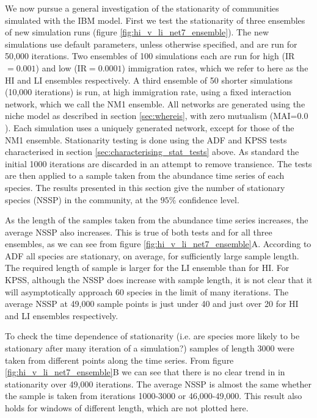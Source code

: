We now pursue a general investigation of the stationarity of communities simulated with the IBM model. First we test the stationarity of three ensembles of new simulation runs (figure \ref{fig:hi_v_li_net7_ensemble}). The new simulations use default parameters, unless otherwise specified, and are run for 50,000 iterations. Two ensembles of 100 simulations each are run for high (IR$=0.001$) and low (IR$=0.0001$) immigration rates, which we refer to here as the HI and LI ensembles respectively. A third ensemble of 50 shorter simulations (10,000 iterations) is run, at high immigration rate, using a fixed interaction network, which we call the NM1 ensemble. All networks are generated using the niche model as described in section \ref{sec:whereis}, with zero mutualism (MAI=$0.0$). Each simulation uses a uniquely generated network, except for those of the NM1 ensemble. Stationarity testing is done using the ADF and KPSS tests characterised in section \ref{sec:characterising_stat_tests} above. As standard the initial 1000 iterations are discarded in an attempt to remove transience. The tests are then applied to a sample taken from the abundance time series of each species. The results presented in this section give the number of stationary species (NSSP) in the community, at the $95\%$ confidence level.

As the length of the samples taken from the abundance time series increases, the average NSSP also increases. This is true of both tests and for all three ensembles, as we can see from figure \ref{fig:hi_v_li_net7_ensemble}A. According to ADF all species are stationary, on average, for sufficiently large sample length. The required length of sample is larger for the LI ensemble than for HI. For KPSS, although the NSSP does increase with sample length, it is not clear that it will asymptotically approach 60 species in the limit of many iterations. The average NSSP at 49,000 sample points is just under 40 and   just over 20 for HI and LI ensembles respectively.

To check the time dependence of stationarity (i.e. are species more likely to be stationary after many iteration of a simulation?) samples of length 3000 were taken from different points along the time series. From figure \ref{fig:hi_v_li_net7_ensemble}B we can see that there is no clear trend in in stationarity over 49,000 iterations. The average NSSP is almost the same whether the sample is taken from iterations 1000-3000 or 46,000-49,000. This result also holds for windows of different length, which are not plotted here.

